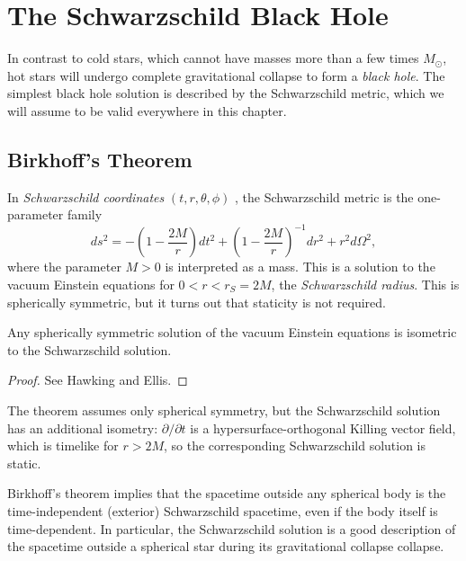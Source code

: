 
\chapter{The Schwarzschild Black Hole}%
\label{cha:the_schwarzschild_black_hole}

In contrast to cold stars, which cannot have masses more than a few times $M_\odot$, hot stars will undergo complete gravitational collapse to form a  \emph{black hole}.
The simplest black hole solution is described by the Schwarzschild metric, which we will assume to be valid everywhere in this chapter.

\section{Birkhoff's Theorem}%
\label{sec:birkhoff_s_theorem}

In \emph{Schwarzschild coordinates} $(t, r, \theta, \phi)$ , the Schwarzschild metric is the one-parameter family
\begin{equation}
  ds^2 = - \left( 1 - \frac{2M}{r} \right) dt^2 + \left( 1- \frac{2M}{r} \right)^{-1} dr^2 + r^2 d\Omega^2,
\end{equation}
where the parameter $M > 0$  is interpreted as a mass.
This is a solution to the vacuum Einstein equations for $0 < r < r_S = 2M$, the  \emph{Schwarzschild radius}.
This is spherically symmetric, but it turns out that staticity is not required.

\begin{theorem}[Birkhoff]
  Any spherically symmetric solution of the vacuum Einstein equations is isometric to the Schwarzschild solution.
\end{theorem}
\begin{proof}
  See Hawking and Ellis.
\end{proof}
The theorem assumes only spherical symmetry, but the Schwarzschild solution has an additional isometry: $\partial / \partial t$ is a hypersurface-orthogonal Killing vector field, which is timelike for $r > 2M$, so the corresponding Schwarzschild solution is static.

Birkhoff's theorem implies that the spacetime outside any spherical body is the time-independent (exterior) Schwarzschild spacetime, even if the body itself is time-dependent.
In particular, the Schwarzschild solution is a good description of the spacetime outside a spherical star during its gravitational collapse collapse.

